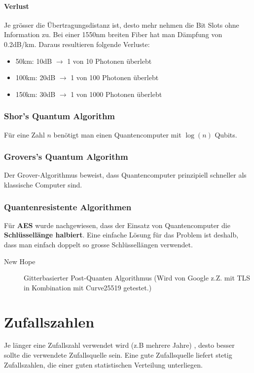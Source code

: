 \paragraph{Verlust}
Je grösser die Übertragungsdistanz  ist, desto mehr nehmen die Bit Slots ohne Information zu. Bei einer 1550nm breiten Fiber hat man Dämpfung von 0.2dB/km. Daraus resultieren folgende Verluste:
\begin{itemize}
	\item 50km: 10dB $\rightarrow$ 1 von 10 Photonen überlebt
	\item 100km: 20dB $\rightarrow$ 1 von 100 Photonen überlebt
	\item 150km: 30dB $\rightarrow$ 1 von 1000 Photonen überlebt
\end{itemize}

\subsubsection{Shor's Quantum Algorithm}
Für eine Zahl $n$ benötigt man einen Quantencomputer mit $\log(n)$ Qubits. 

\subsubsection{Grovers's Quantum Algorithm}
Der Grover-Algorithmus beweist, dass Quantencomputer prinzipiell schneller als klassische Computer sind. 

\subsubsection{Quantenresistente Algorithmen}
Für \textbf{AES} wurde nachgewiesen, dass der Einsatz von Quantencomputer die \textbf{Schlüssellänge halbiert}. Eine einfache Lösung für das Problem ist deshalb, dass man einfach doppelt so grosse Schlüssellängen verwendet. 
\begin{description}
	\item[New Hope] Gitterbasierter Post-Quanten Algorithmus (Wird von Google z.Z. mit TLS in Kombination mit Curve25519 getestet.)
\end{description}


\section{Zufallszahlen}
Je länger eine Zufallszahl verwendet wird (z.B mehrere Jahre) , desto besser sollte die verwendete Zufallsquelle sein. Eine gute Zufallsquelle liefert stetig Zufallszahlen, die einer guten statistischen Verteilung unterliegen.

